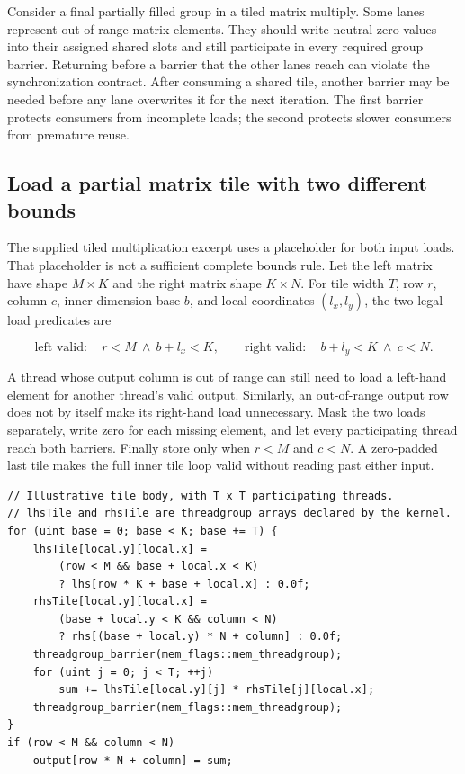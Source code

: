 Consider a final partially filled group in a tiled matrix multiply. Some lanes represent out-of-range matrix elements. They should write neutral zero values into their assigned shared slots and still participate in every required group barrier. Returning before a barrier that the other lanes reach can violate the synchronization contract. After consuming a shared tile, another barrier may be needed before any lane overwrites it for the next iteration. The first barrier protects consumers from incomplete loads; the second protects slower consumers from premature reuse.

\subsection{Load a partial matrix tile with two different bounds}\label{03-visual-computing-i-ch015-load-a-partial-matrix-tile-with-two-different-bounds}

\hypertarget{03-visual-computing-i-ch015-load-a-partial-matrix-tile-with-two-different-bounds}{}

The supplied tiled multiplication excerpt uses a placeholder  for both input loads. That placeholder is not a sufficient complete bounds rule. Let the left matrix have shape \(M\times K\) and the right matrix shape \(K\times N\). For tile width \(T\), row \(r\), column \(c\), inner-dimension base \(b\), and local coordinates \((l_x,l_y)\), the two legal-load predicates are

\[
\text{left valid}:\quad r<M\ \land\ b+l_x<K,
\qquad
\text{right valid}:\quad b+l_y<K\ \land\ c<N.
\]

A thread whose output column is out of range can still need to load a left-hand element for another thread's valid output. Similarly, an out-of-range output row does not by itself make its right-hand load unnecessary. Mask the two loads separately, write zero for each missing element, and let every participating thread reach both barriers. Finally store only when \(r<M\) and \(c<N\). A zero-padded last tile makes the full inner tile loop valid without reading past either input.

\begin{verbatim}
// Illustrative tile body, with T x T participating threads.
// lhsTile and rhsTile are threadgroup arrays declared by the kernel.
for (uint base = 0; base < K; base += T) {
    lhsTile[local.y][local.x] =
        (row < M && base + local.x < K)
        ? lhs[row * K + base + local.x] : 0.0f;
    rhsTile[local.y][local.x] =
        (base + local.y < K && column < N)
        ? rhs[(base + local.y) * N + column] : 0.0f;
    threadgroup_barrier(mem_flags::mem_threadgroup);
    for (uint j = 0; j < T; ++j)
        sum += lhsTile[local.y][j] * rhsTile[j][local.x];
    threadgroup_barrier(mem_flags::mem_threadgroup);
}
if (row < M && column < N)
    output[row * N + column] = sum;
\end{verbatim}

